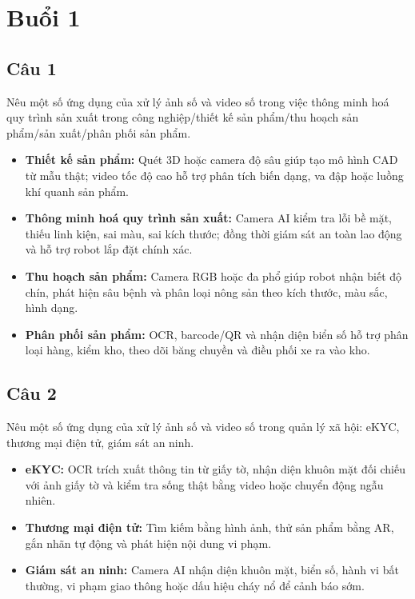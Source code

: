 \chapter{Buổi 1}
\label{Chapter1}
\setcounter{secnumdepth}{5}

\section*{Câu 1}
Nêu một số ứng dụng của xử lý ảnh số và video số trong việc thông minh hoá quy trình sản xuất trong công nghiệp/thiết kế sản phẩm/thu hoạch sản phẩm/sản xuất/phân phối sản phẩm.

\begin{itemize}
    \item \textbf{Thiết kế sản phẩm:} Quét 3D hoặc camera độ sâu giúp tạo mô hình CAD từ mẫu thật; video tốc độ cao hỗ trợ phân tích biến dạng, va đập hoặc luồng khí quanh sản phẩm.
    \item \textbf{Thông minh hoá quy trình sản xuất:} Camera AI kiểm tra lỗi bề mặt, thiếu linh kiện, sai màu, sai kích thước; đồng thời giám sát an toàn lao động và hỗ trợ robot lắp đặt chính xác.
    \item \textbf{Thu hoạch sản phẩm:} Camera RGB hoặc đa phổ giúp robot nhận biết độ chín, phát hiện sâu bệnh và phân loại nông sản theo kích thước, màu sắc, hình dạng.
    \item \textbf{Phân phối sản phẩm:} OCR, barcode/QR và nhận diện biển số hỗ trợ phân loại hàng, kiểm kho, theo dõi băng chuyền và điều phối xe ra vào kho.
\end{itemize}

\section*{Câu 2}
Nêu một số ứng dụng của xử lý ảnh số và video số trong quản lý xã hội: eKYC, thương mại điện tử, giám sát an ninh.

\begin{itemize}
    \item \textbf{eKYC:} OCR trích xuất thông tin từ giấy tờ, nhận diện khuôn mặt đối chiếu với ảnh giấy tờ và kiểm tra sống thật bằng video hoặc chuyển động ngẫu nhiên.
    \item \textbf{Thương mại điện tử:} Tìm kiếm bằng hình ảnh, thử sản phẩm bằng AR, gắn nhãn tự động và phát hiện nội dung vi phạm.
    \item \textbf{Giám sát an ninh:} Camera AI nhận diện khuôn mặt, biển số, hành vi bất thường, vi phạm giao thông hoặc dấu hiệu cháy nổ để cảnh báo sớm.
\end{itemize}


